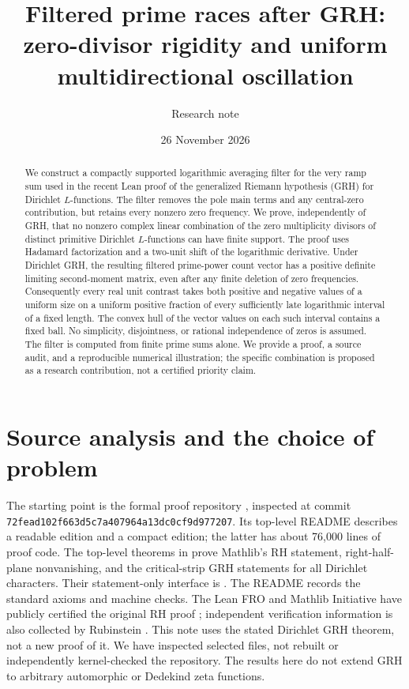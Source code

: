 \documentclass[11pt]{article}
\title{\bfseries Filtered prime races after GRH:\\zero-divisor rigidity and uniform multidirectional oscillation}
\author{Research note}
\date{26 November 2026}
\begin{document}
\maketitle
\begin{abstract}
We construct a compactly supported logarithmic averaging filter for the very ramp sum used in the recent Lean proof of the generalized Riemann hypothesis (GRH) for Dirichlet $L$-functions. The filter removes the pole main terms and any central-zero contribution, but retains every nonzero zero frequency. We prove, independently of GRH, that no nonzero complex linear combination of the zero multiplicity divisors of distinct primitive Dirichlet $L$-functions can have finite support. The proof uses Hadamard factorization and a two-unit shift of the logarithmic derivative. Under Dirichlet GRH, the resulting filtered prime-power count vector has a positive definite limiting second-moment matrix, even after any finite deletion of zero frequencies. Consequently every real unit contrast takes both positive and negative values of a uniform size on a uniform positive fraction of every sufficiently late logarithmic interval of a fixed length. The convex hull of the vector values on each such interval contains a fixed ball. No simplicity, disjointness, or rational independence of zeros is assumed. The filter is computed from finite prime sums alone. We provide a proof, a source audit, and a reproducible numerical illustration; the specific combination is proposed as a research contribution, not a certified priority claim.
\end{abstract}

\section{Source analysis and the choice of problem}
The starting point is the formal proof repository \cite{sernau}, inspected at commit
\texttt{72fead102f663d5c7}\allowbreak\texttt{a407964a13dc0cf9d977207}. Its top-level README describes a readable edition and a compact edition; the latter has about 76,000 lines of proof code. The top-level theorems in  prove Mathlib's RH statement, right-half-plane nonvanishing, and the critical-strip GRH statements for all Dirichlet characters. Their statement-only interface is . The README records the standard axioms and machine checks. The Lean FRO and Mathlib Initiative have publicly certified the original RH proof \cite{leanverification}; independent verification information is also collected by Rubinstein \cite{rubinstein}. This note uses the stated Dirichlet GRH theorem, not a new proof of it. We have inspected selected files, not rebuilt or independently kernel-checked the repository. The results here do not extend GRH to arbitrary automorphic or Dedekind zeta functions.
\end{document}
